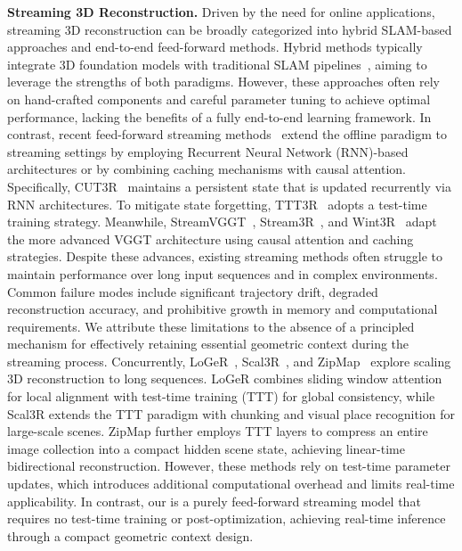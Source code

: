 \noindent\textbf{Streaming 3D Reconstruction.}
Driven by the need for online applications, streaming 3D reconstruction can be broadly categorized into hybrid SLAM-based approaches and end-to-end feed-forward methods.
Hybrid methods typically integrate 3D foundation models with traditional SLAM pipelines~\cite{vggtslam, mast3rslam, deng2025vggt}, aiming to leverage the strengths of both paradigms.
However, these approaches often rely on hand-crafted components and careful parameter tuning to achieve optimal performance, lacking the benefits of a fully end-to-end learning framework.
In contrast, recent feed-forward streaming methods~\cite{stream3r2025, li2025wint3r, streamVGGT, wang20253d, wang2025continuous} extend the offline paradigm to streaming settings by employing Recurrent Neural Network (RNN)-based architectures or by combining caching mechanisms with causal attention.
Specifically, CUT3R~\cite{cut3r} maintains a persistent state that is updated recurrently via RNN architectures.
To mitigate state forgetting, TTT3R~\cite{chen2025ttt3r} adopts a test-time training strategy.
Meanwhile, StreamVGGT~\cite{streamVGGT}, Stream3R~\cite{stream3r2025}, and Wint3R~\cite{li2025wint3r} adapt the more advanced VGGT architecture using causal attention and caching strategies.
Despite these advances, existing streaming methods often struggle to maintain performance over long input sequences and in complex environments.
Common failure modes include significant trajectory drift, degraded reconstruction accuracy, and prohibitive growth in memory and computational requirements.
We attribute these limitations to the absence of a principled mechanism for effectively retaining essential geometric context during the streaming process.
Concurrently, LoGeR~\cite{zhang2026loger}, Scal3R~\cite{xie2026scal3r}, and ZipMap~\cite{jin2026zipmap} explore scaling 3D reconstruction to long sequences.
%
LoGeR combines sliding window attention for local alignment with test-time training (TTT) for global consistency, while Scal3R extends the TTT paradigm with chunking and visual place recognition for large-scale scenes.
%
ZipMap further employs TTT layers to compress an entire image collection into a compact hidden scene state, achieving linear-time bidirectional reconstruction.
%
However, these methods rely on test-time parameter updates, which introduces additional computational overhead and limits real-time applicability.
%
In contrast, our \method is a purely feed-forward streaming model that requires no test-time training or post-optimization, achieving real-time inference through a compact geometric context design.
